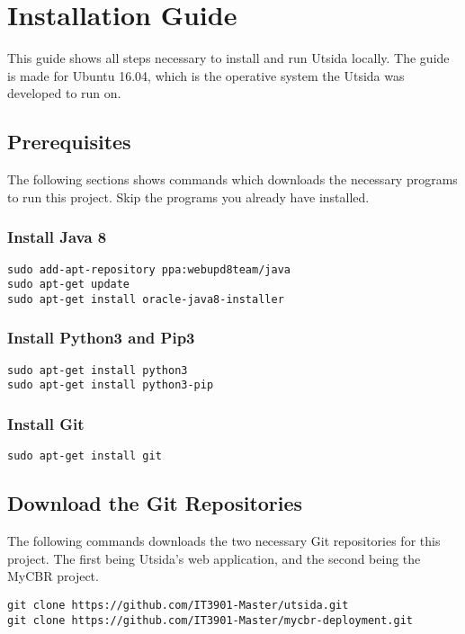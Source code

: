 \chapter{Installation Guide}\label{app:installation_guide}
This guide shows all steps necessary to install and run Utsida locally. The guide is made for Ubuntu 16.04, which is the operative system the Utsida was developed to run on.

\section*{Prerequisites}
The following sections shows commands which downloads the necessary programs to run this project. Skip the programs you already have installed.

\subsection*{Install Java 8}
\begin{verbatim}
sudo add-apt-repository ppa:webupd8team/java
sudo apt-get update
sudo apt-get install oracle-java8-installer
\end{verbatim}

\subsection*{Install Python3 and Pip3}
\begin{verbatim}
sudo apt-get install python3                                       
sudo apt-get install python3-pip   
\end{verbatim}

\subsection*{Install Git}
\begin{verbatim}
sudo apt-get install git   
\end{verbatim}

\section*{Download the Git Repositories}
The following commands downloads the two necessary Git repositories for this project. The first being Utsida's web application, and the second being the MyCBR project.

\begin{verbatim}
git clone https://github.com/IT3901-Master/utsida.git              
git clone https://github.com/IT3901-Master/mycbr-deployment.git    
\end{verbatim}



